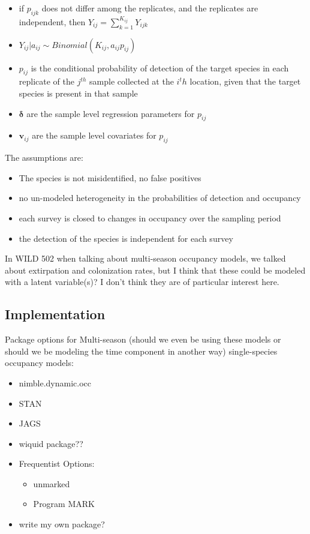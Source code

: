 \documentclass[12pt]{article}\usepackage[]{graphicx}\usepackage[]{color}
\begin{document}
\begin{itemize}
\item if $p_{ijk}$ does not differ among the replicates, and the replicates are independent, then $Y_{ij} = \sum_{k = 1}^{K_{ij}}Y_{ijk}$
\item $Y_{ij}|a_{ij} \sim Binomial(K_{ij}, a_{ij}p_{ij})$
\item $p_{ij}$ is the conditional probability of detection of the target species in each replicate of the $j^{th}$ sample collected at the $i^th$ location, given that the target species is present in that sample
\item $\bm{\delta}$ are the sample level regression parameters for $p_{ij}$ 
\item $\bm{v}_{ij}$ are the sample level covariates for $p_{ij}$
\end{itemize}

The assumptions are: 
\begin{itemize}
\item The species is not misidentified, no false positives
\item no un-modeled heterogeneity in the probabilities of detection and occupancy
\item each survey is closed to changes in occupancy over the sampling period
\item the detection of the species is independent for each survey
\end{itemize}


In WILD 502 when talking about multi-season occupancy models, we talked about extirpation and colonization rates, but I think that these could be modeled with a latent variable(s)? I don't think they are of particular interest here. 






 
\subsection{Implementation}

Package options for Multi-season (should we even be using these models or should we be modeling the time component in another way) single-species occupancy models: 
\begin{itemize}
\item nimble.dynamic.occ
\item STAN
\item JAGS
\item wiquid package??
\item Frequentist Options: 
  \begin{itemize}
  \item unmarked
  \item Program MARK
  \end{itemize}
\item write my own package? 
\end{itemize}
\end{document}

